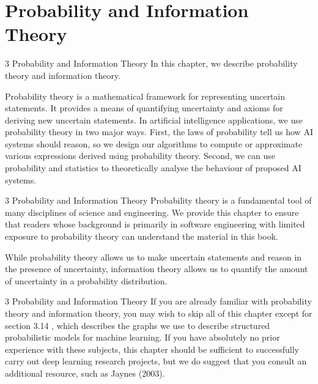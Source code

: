 \section{Probability and Information Theory}
\setcounter{section}{3}

\begin{frame}{3 Probability and Information Theory}
    \justifying
    In this chapter, we describe probability theory and information theory.
    
    Probability theory is a mathematical framework for representing uncertain statements. It provides a means of quantifying uncertainty and axioms for deriving new uncertain statements. In artificial intelligence applications, we use probability theory in two major ways. First, the laws of probability tell us how AI systems should reason, so we design our algorithms to compute or approximate various expressions derived using probability theory. Second, we can use probability and statistics to theoretically analyse the behaviour of proposed AI systems.
\end{frame}

\begin{frame}{3 Probability and Information Theory}
    \justifying
    Probability theory is a fundamental tool of many disciplines of science and engineering. We provide this chapter to ensure that readers whose background is primarily in software engineering with limited exposure to probability theory can understand the material in this book.
    
    While probability theory allows us to make uncertain statements and reason in the presence of uncertainty, information theory allows us to quantify the amount of uncertainty in a probability distribution.
\end{frame}

\begin{frame}{3 Probability and Information Theory}
    \justifying
    If you are already familiar with probability theory and information theory, you may wish to skip all of this chapter except for section 3.14 , which describes the graphs we use to describe structured probabilistic models for machine learning. If you have absolutely no prior experience with these subjects, this chapter should be sufficient to successfully carry out deep learning research projects, but we do suggest that you consult an additional resource, such as Jaynes (2003).
\end{frame}

